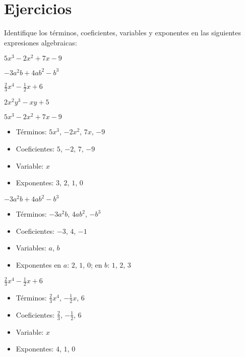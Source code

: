 
\section{Ejercicios}

\begin{exercise}
\problem Identifique los términos, coeficientes, variables y exponentes en las siguientes expresiones algebraicas:

\begin{exerciselist}
    \item $5x^3 - 2x^2 + 7x - 9$
    \item $-3a^2b + 4ab^2 - b^3$
    \item $\frac{2}{3}x^4 - \frac{1}{2}x + 6$
    \item $2x^2y^3 - xy + 5$
\end{exerciselist}

\begin{solucion}
\begin{exerciselist}
    \item $5x^3 - 2x^2 + 7x - 9$
    \begin{itemize}
        \item Términos: $5x^3$, $-2x^2$, $7x$, $-9$
        \item Coeficientes: $5$, $-2$, $7$, $-9$
        \item Variable: $x$
        \item Exponentes: $3$, $2$, $1$, $0$
    \end{itemize}
    
    \item $-3a^2b + 4ab^2 - b^3$
    \begin{itemize}
        \item Términos: $-3a^2b$, $4ab^2$, $-b^3$
        \item Coeficientes: $-3$, $4$, $-1$
        \item Variables: $a$, $b$
        \item Exponentes en $a$: $2$, $1$, $0$; en $b$: $1$, $2$, $3$
    \end{itemize}
    
    \item $\frac{2}{3}x^4 - \frac{1}{2}x + 6$
    \begin{itemize}
        \item Términos: $\frac{2}{3}x^4$, $-\frac{1}{2}x$, $6$
        \item Coeficientes: $\frac{2}{3}$, $-\frac{1}{2}$, $6$
        \item Variable: $x$
        \item Exponentes: $4$, $1$, $0$
    \end{itemize}
    

\end{exerciselist}
\end{solucion}
\end{exercise}
